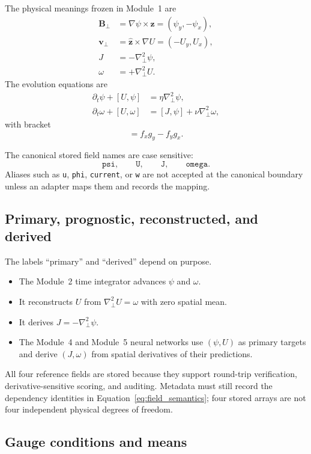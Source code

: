 \documentclass[11pt]{article}
\newcommand{\vect}[1]{\bm{#1}}
\newcommand{\pd}{\partial}
\newcommand{\Lap}{\nabla_{\!\perp}^{2}}
\newcommand{\code}[1]{\texttt{#1}}
\begin{document}
The physical meanings frozen in Module~1 are
\begin{align}
\vect B_\perp&=\nabla\psi\times\widehat{\vect z}
=(\psi_y,-\psi_x),\\
\vect v_\perp&=\widehat{\vect z}\times\nabla U
=(-U_y,U_x),\\
J&=-\Lap\psi,\\
\omega&=+\Lap U.
\label{eq:field_semantics}
\end{align}
The evolution equations are
\begin{align}
\pd_t\psi+[U,\psi]&=\eta\Lap\psi,\\
\pd_t\omega+[U,\omega]&=[J,\psi]+\nu\Lap\omega,
\end{align}
with bracket
\begin{equation}
[f,g]=f_xg_y-f_yg_x.
\end{equation}

The canonical stored field names are case sensitive:
\begin{equation}
\code{psi},\qquad \code{U},\qquad \code{J},\qquad \code{omega}.
\end{equation}
Aliases such as \code{u}, \code{phi}, \code{current}, or \code{w} are not accepted at the canonical boundary unless an adapter maps them and records the mapping.

\subsection{Primary, prognostic, reconstructed, and derived}

The labels ``primary'' and ``derived'' depend on purpose.
\begin{itemize}
  \item The Module~2 time integrator advances $\psi$ and $\omega$.
  \item It reconstructs $U$ from $\Lap U=\omega$ with zero spatial mean.
  \item It derives $J=-\Lap\psi$.
  \item The Module~4 and Module~5 neural networks use $(\psi,U)$ as primary targets and derive $(J,\omega)$ from spatial derivatives of their predictions.
\end{itemize}
All four reference fields are stored because they support round-trip verification, derivative-sensitive scoring, and auditing. Metadata must still record the dependency identities in Equation~\eqref{eq:field_semantics}; four stored arrays are not four independent physical degrees of freedom.

\subsection{Gauge conditions and means}
\end{document}
